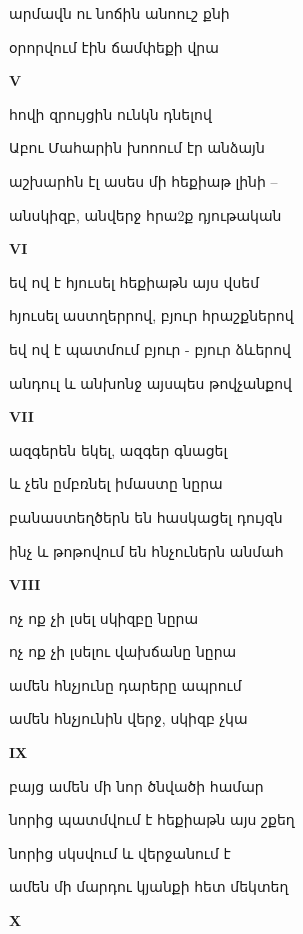 արմավն ու նոճին անոուշ քնի 



օրորվում էին ճամփեքի վրա  


\centerline {\bf V}


հովի զրույցին ունկն դնելով  



Աբու Մահարին խոոում  էր  անձայն



աշխարհն էլ ասես մի  հեքիաթ լինի -- 



անսկիզբ, անվերջ հրա2ք     դյութական



\centerline {\bf  VI}



    եվ ով է հյուսել հեքիաթն այս վսեմ 



   հյուսել աստղերրով, բյուր հրաշքներով



   եվ ով է պատմում բյուր - բյուր ձևերով


  անդուլ և անխոնջ այսպես   թովչանքով 

\centerline {\bf VII}


ազգերեն եկել, ազգեր գնացել



և չեն ըմբռնել իմաստը նըրա


 բանաստեղծերն են հասկացել դույզն


   ինչ և թոթովում  են հնչուներն անմահ  


\centerline {\bf VIII}

ոչ ոք չի լսել սկիզբը նըրա 




ոչ ոք չի լսելու վախճանը նըրա




ամեն հնչյունը դարերը ապրում



ամեն հնչյունին վերջ, սկիզբ չկա





\centerline {\bf IX}  
բայց ամեն մի  նոր ծնվածի համար


նորից  պատմվում է հեքիաթն այս շքեղ

նորից սկսվում և  վերջանում է  



ամեն մի մարդու  կյանքի հետ մեկտեղ 



\centerline  {\bf X}




